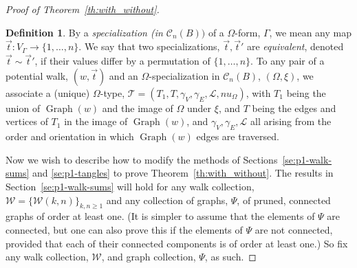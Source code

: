 \documentclass{memo-l}
\newcommand{\nonsigma}{\xi}
\theoremstyle{plain}
\theoremstyle{definition}
\newtheorem{definition}[theorem]{Definition}
\numberwithin{section}{chapter}
\numberwithin{equation}{chapter}
\newcommand{\cal}{\mathcal}
\DeclareMathOperator{\Graph}{Graph}
\newcommand{\from}{\colon}
\theoremstyle{plain}
\theoremstyle{definition}
\newcommand\cC{\mathcal{C}}
\newcommand\cL{\mathcal{L}}
\newcommand\cW{\mathcal{W}}
\begin{document}
\begin{proof}[Proof of Theorem~\ref{th:with_without}]
\begin{definition} 
By a {\em specialization (in $\cC_n(B))$} 
of a $\Omega$-form, $\Gamma$, we mean any
map $\vec t\from V_\Gamma\to\{1,\ldots,n\}$.
We say that two specializations, $\vec t,\vec t'$
are {\em equivalent}, denoted $\vec t\sim\vec t'$, if their values
differ by a permutation of $\{1,\ldots,n\}$.
To any pair of a
potential walk, $(w,\vec t)$ and an $\Omega$-specialization in $\cC_n(B)$,
$(\Omega,\nonsigma)$, 
we associate a (unique) $\Omega$-type, $\cal T=(T_1,T,\gamma_V,\gamma_E,
\cL,nu_\Omega)$, 
with $T_1$ being the union of $\Graph(w)$ and the image of $\Omega$
under $\nonsigma$, and $T$ being the edges and vertices of $T_1$ in
the image of $\Graph(w)$, and $\gamma_V,\gamma_E,\cL$ all arising
from the order and orientation in which $\Graph(w)$ edges are traversed.
\end{definition}

Now we wish to describe how to modify the methods of 
Sections~\ref{se:p1-walk-sums} and \ref{se:p1-tangles}
to prove Theorem~\ref{th:with_without}.
The results in Section~\ref{se:p1-walk-sums}
will hold for any walk collection, 
$\cW=\{ \cW(k,n) \}_{k,n\ge 1}$ and any
collection of graphs, $\Psi$, of pruned, connected graphs of
order at least one.  (It is simpler to assume that the elements of $\Psi$
are connected, but one can also prove this if the elements of $\Psi$
are not connected, provided that each of their connected components is
of order at least one.)
So fix any walk collection, $\cW$, and graph collection, $\Psi$, as 
such.


\end{proof}
\end{document}

